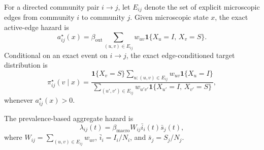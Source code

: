 For a directed community pair $i\to j$, let $E_{ij}$ denote the set of explicit microscopic edges from community $i$ to community $j$.  Given microscopic state $x$, the exact active-edge hazard is
\begin{equation}
    a^{\star}_{ij}(x)
    =
    \beta_{\mathrm{out}}
    \sum_{(u,v)\in E_{ij}}
    w_{uv}
    \mathbf{1}\{X_u=I,\,X_v=S\}.
    \label{eq:ablation_exact_hazard}
\end{equation}
Conditional on an exact event on $i\to j$, the exact edge-conditioned target distribution is
\begin{equation}
    \pi^{\star}_{ij}(v\mid x)
    =
    \frac{
    \mathbf{1}\{X_v=S\}
    \sum_{u:(u,v)\in E_{ij}}
    w_{uv}\mathbf{1}\{X_u=I\}
    }{
    \sum_{(u',v')\in E_{ij}}
    w_{u'v'}\mathbf{1}\{X_{u'}=I,\,X_{v'}=S\}
    },
    \label{eq:ablation_exact_placement}
\end{equation}
whenever $a^{\star}_{ij}(x)>0$.

The prevalence-based aggregate hazard is
\begin{equation}
    \lambda_{ij}(t)
    =
    \beta_{\mathrm{macro}}W_{ij}
    \bar{i}_{i}(t)\bar{s}_{j}(t),
    \label{eq:ablation_aggregate_hazard}
\end{equation}
where $W_{ij}=\sum_{(u,v)\in E_{ij}}w_{uv}$, $\bar{i}_{i}=I_i/N_i$, and $\bar{s}_{j}=S_j/N_j$.

